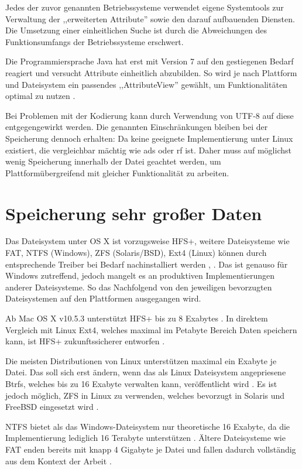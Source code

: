 \documentclass[oneside, ngerman, toc=bibliography,bibliography=totoc,listof=entryprefix, open=right,numbers=noenddot,fontsize=12pt]{scrbook}
\begin{document}
Jedes der zuvor genannten Betriebssysteme verwendet eigene Systemtools zur Verwaltung der ,,erweiterten Attribute'' sowie den darauf aufbauenden Diensten. Die Umsetzung einer einheitlichen Suche ist durch die Abweichungen des Funktionsumfangs der Betriebssysteme erschwert.

Die Programmiersprache Java hat erst mit Version 7 auf den gestiegenen Bedarf reagiert und versucht Attribute einheitlich abzubilden. So wird je nach Plattform und Dateisystem ein passendes ,,AttributeView'' gewählt, um Funktionalitäten optimal zu nutzen \cite{javanio}.

Bei Problemen mit der Kodierung kann durch Verwendung von UTF-8 auf diese entgegengewirkt werden.
Die genannten Einschränkungen bleiben bei der Speicherung dennoch erhalten: Da keine geeignete Implementierung unter Linux existiert, die vergleichbar mächtig  wie \acrshort{ads} oder \acrshort{rf} ist. Daher muss auf möglichst wenig Speicherung innerhalb der Datei geachtet werden, um Plattformübergreifend mit gleicher Funktionalität zu arbeiten.

  

\section{Speicherung sehr großer Daten}

Das Dateisystem unter OS X ist vorzugsweise {HFS+}, weitere Dateisysteme wie {FAT}, { NTFS} (Windows), {ZFS} (Solaris/BSD), {Ext4} (Linux) können durch entsprechende Treiber bei Bedarf nachinstalliert werden \cite{winext}, \cite{macntfs}. Das ist genauso für Windows zutreffend, jedoch mangelt es an produktiven Implementierungen anderer Dateisysteme. So das Nachfolgend von den jeweiligen bevorzugten Dateisystemen auf den Plattformen ausgegangen wird.

Ab Mac OS X v10.5.3 unterstützt  {HFS+} bis zu 8 Exabytes \cite{maclimit}. In direktem Vergleich mit Linux Ext4, welches maximal im Petabyte Bereich Daten speichern kann, ist HFS+ zukunftssicherer entworfen \cite{kernelwiki}.

Die meisten Distributionen von Linux unterstützen maximal ein Exabyte je Datei. Das soll sich erst ändern, wenn das als Linux Dateisystem angepriesene {Btrfs}, welches bis zu 16 Exabyte verwalten kann, veröffentlicht wird \cite{btrfs}. Es ist jedoch möglich, ZFS in Linux zu verwenden, welches bevorzugt in Solaris und FreeBSD eingesetzt wird \cite{zfslinux}.

NTFS bietet als das Windows-Dateisystem nur theoretische 16 Exabyte, da die Implementierung lediglich 16 Terabyte unterstützen \cite{ntfslimit}. Ältere Dateisysteme wie {FAT} enden bereits mit knapp 4 Gigabyte je Datei und fallen dadurch vollständig aus dem Kontext der Arbeit \cite{fatlimit}.
 
\end{document}
